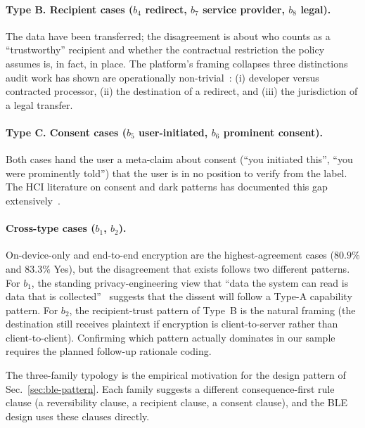 \documentclass[11pt,a4paper]{article}
\begin{document}
\paragraph{Type B. Recipient cases ($b_4$ redirect, $b_7$ service
provider, $b_8$ legal).}
The data have been transferred; the disagreement is about who
counts as a ``trustworthy'' recipient and whether the contractual
restriction the policy assumes is, in fact, in place. The platform's
framing collapses three distinctions audit work has shown are
operationally
non-trivial~\citep{kollnig:etal:2022,koch:etal:2022,
khandelwal:etal:2023,andow:etal:2020}: (i) developer versus
contracted processor, (ii) the destination of a redirect, and
(iii) the jurisdiction of a legal transfer.

\paragraph{Type C. Consent cases ($b_5$ user-initiated, $b_6$
prominent consent).}
Both cases hand the user a meta-claim about consent
(``you initiated this'', ``you were prominently told'') that the
user is in no position to verify from the label. The HCI literature
on consent and dark patterns has documented this gap
extensively~\citep{habib:etal:2022,jensen:potts:2004,
adjerid:etal:2013,good:etal:2007}.

\paragraph{Cross-type cases ($b_1$, $b_2$).}
On-device-only and end-to-end encryption are the highest-agreement
cases ($80.9\%$ and $83.3\%$ Yes), but the disagreement that exists
follows two different patterns. For $b_1$, the standing
privacy-engineering view that ``data the system can read is data
that is collected''~\citep{spiekermann:cranor:2009,cavoukian:2009}
suggests that the dissent will follow a Type-A capability pattern.
For $b_2$, the recipient-trust pattern of Type~B is the natural
framing (the destination still receives plaintext if encryption is
client-to-server rather than client-to-client). Confirming which
pattern actually dominates in our sample requires the planned
follow-up rationale coding.



The three-family typology is the empirical motivation for the
design pattern of Sec.~\ref{sec:ble-pattern}. Each family suggests
a different consequence-first rule clause (a reversibility clause,
a recipient clause, a consent clause), and the BLE design uses
these clauses directly.
\end{document}
